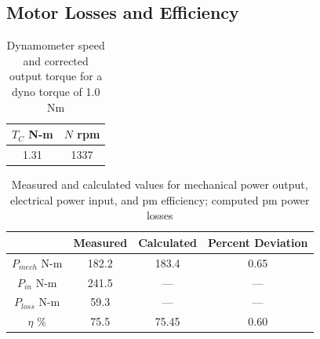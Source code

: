 \documentclass{article}
\begin{document}
\subsection{Motor Losses and Efficiency}

\begin{table}[H]
  \centering
  \begin{tabular}{*{2}{c}}
    $T_{C}$ N-m& $N$ rpm \\
    \hline
    1.31 & 1337  \\
  \end{tabular}
  \caption{Dynamometer speed and corrected output torque for a dyno torque of 1.0 Nm}
  \label{tab:table_04}
\end{table}

\begin{table}[H]
  \centering
  \begin{tabular}{*{4}{c}}
    & Measured & Calculated & Percent Deviation \\
    \hline
    $P_{mech}$ N-m & 182.2 & 183.4  & 0.65  \\
    $P_{in}$ N-m & 241.5 & --- & --- \\
    $P_{loss}$ N-m & 59.3 & --- & --- \\
    $\eta$ \% & 75.5 & 75.45 & 0.60 \\
  \end{tabular}
  \caption{Measured and calculated values for mechanical power output,
    electrical power input, and \gls{pm} efficiency; computed \gls{pm}
  power losses}
  \label{tab:table_05}
\end{table}
\end{document}
